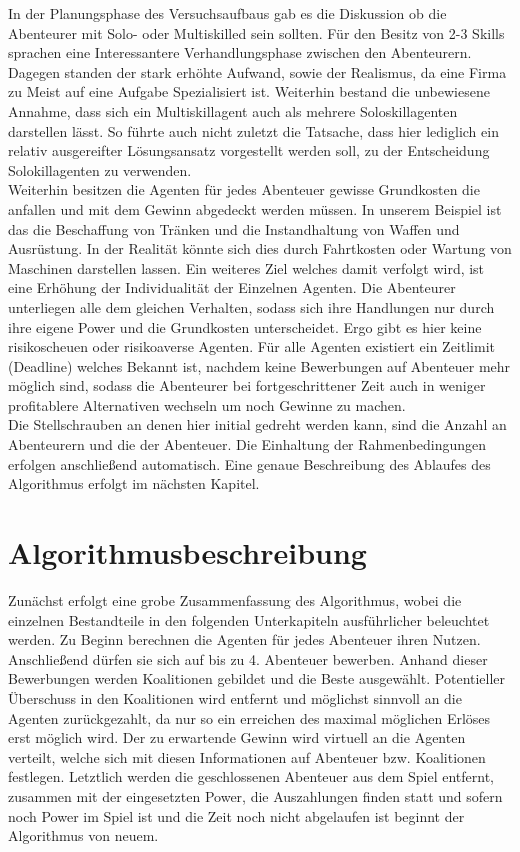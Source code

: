 \documentclass[fleqn,10pt]{SelfArx} %
\begin{document}
In der Planungsphase des Versuchsaufbaus gab es die Diskussion ob die Abenteurer mit Solo- oder Multiskilled sein sollten. Für den Besitz von 2-3 Skills sprachen eine Interessantere Verhandlungsphase zwischen den Abenteurern. Dagegen standen der stark erhöhte Aufwand, sowie der Realismus, da eine Firma zu Meist auf eine Aufgabe Spezialisiert ist. Weiterhin bestand die unbewiesene Annahme, dass sich ein Multiskillagent auch als mehrere Soloskillagenten darstellen lässt. So führte auch nicht zuletzt die Tatsache, dass hier lediglich ein relativ ausgereifter Lösungsansatz vorgestellt werden soll, zu der Entscheidung Solokillagenten zu verwenden. \\
Weiterhin besitzen die Agenten für jedes Abenteuer gewisse Grundkosten die anfallen und mit dem Gewinn abgedeckt werden müssen. In unserem Beispiel ist das die Beschaffung von Tränken und die Instandhaltung von Waffen und Ausrüstung. In der Realität könnte sich dies durch Fahrtkosten oder Wartung von Maschinen darstellen lassen. Ein weiteres Ziel welches damit verfolgt wird, ist eine Erhöhung der Individualität der Einzelnen Agenten. Die Abenteurer unterliegen alle dem gleichen Verhalten, sodass sich ihre Handlungen nur durch ihre eigene Power und die Grundkosten unterscheidet. Ergo gibt es hier keine risikoscheuen oder risikoaverse Agenten. Für alle Agenten existiert ein Zeitlimit (Deadline) welches Bekannt ist, nachdem keine Bewerbungen auf Abenteuer mehr möglich sind, sodass die Abenteurer bei fortgeschrittener Zeit auch in weniger profitablere Alternativen wechseln um noch Gewinne zu machen.\\
Die Stellschrauben an denen hier initial gedreht werden kann, sind die Anzahl an Abenteurern und die der Abenteuer. Die Einhaltung der Rahmenbedingungen erfolgen anschließend automatisch. Eine genaue Beschreibung des Ablaufes des Algorithmus erfolgt im nächsten Kapitel.\\



\section{Algorithmusbeschreibung}
\label{sec:Algorithmus}
Zunächst erfolgt eine grobe Zusammenfassung des Algorithmus, wobei die einzelnen Bestandteile in den folgenden Unterkapiteln ausführlicher beleuchtet werden. Zu Beginn berechnen die Agenten für jedes Abenteuer ihren Nutzen. Anschließend dürfen sie sich auf bis zu 4. Abenteuer bewerben. Anhand dieser Bewerbungen werden Koalitionen gebildet und die Beste ausgewählt. Potentieller Überschuss in den Koalitionen wird entfernt und möglichst sinnvoll an die Agenten zurückgezahlt, da nur so ein erreichen des maximal möglichen Erlöses erst möglich wird. Der zu erwartende Gewinn wird virtuell an die Agenten verteilt, welche sich mit diesen Informationen auf Abenteuer bzw. Koalitionen festlegen. Letztlich werden die geschlossenen Abenteuer aus dem Spiel entfernt, zusammen mit der eingesetzten Power, die Auszahlungen finden statt und sofern noch Power im Spiel ist und die Zeit noch nicht abgelaufen ist beginnt der Algorithmus von neuem.
\end{document}
